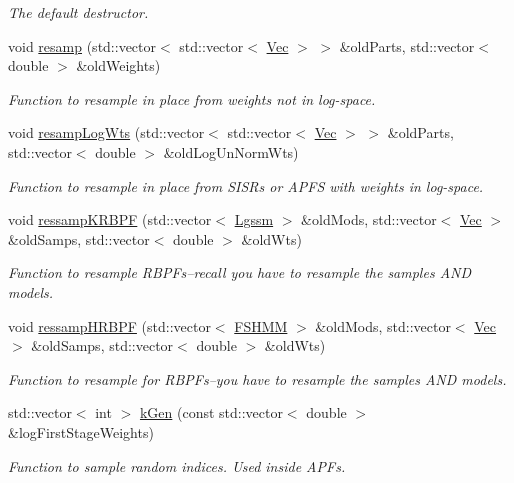 \begin{DoxyCompactItemize}
\begin{DoxyCompactList}\small\item\em The default destructor. \end{DoxyCompactList}\item 
void \hyperlink{classMultinomResamp_a0c24d6d59254855421b8ae13b2ebbcd9}{resamp} (std\+::vector$<$ std\+::vector$<$ \hyperlink{pmfs_8h_a4c7df05c6f5e8a0d15ae14bcdbc07152}{Vec} $>$ $>$ \&old\+Parts, std\+::vector$<$ double $>$ \&old\+Weights)
\begin{DoxyCompactList}\small\item\em Function to resample in place from weights {\itshape not} in log-\/space. \end{DoxyCompactList}\item 
void \hyperlink{classMultinomResamp_a0ea6269180faf0b0613072d9bc8a7b53}{resamp\+Log\+Wts} (std\+::vector$<$ std\+::vector$<$ \hyperlink{pmfs_8h_a4c7df05c6f5e8a0d15ae14bcdbc07152}{Vec} $>$ $>$ \&old\+Parts, std\+::vector$<$ double $>$ \&old\+Log\+Un\+Norm\+Wts)
\begin{DoxyCompactList}\small\item\em Function to resample in place from S\+I\+S\+Rs or A\+P\+FS with weights in log-\/space. \end{DoxyCompactList}\item 
void \hyperlink{classMultinomResamp_ad39c4f5d5460e3e4a2c56370c8dab39f}{ressamp\+K\+R\+B\+PF} (std\+::vector$<$ \hyperlink{classLgssm}{Lgssm} $>$ \&old\+Mods, std\+::vector$<$ \hyperlink{pmfs_8h_a4c7df05c6f5e8a0d15ae14bcdbc07152}{Vec} $>$ \&old\+Samps, std\+::vector$<$ double $>$ \&old\+Wts)
\begin{DoxyCompactList}\small\item\em Function to resample R\+B\+P\+Fs--recall you have to resample the samples A\+ND models. \end{DoxyCompactList}\item 
void \hyperlink{classMultinomResamp_aaddcbec4eb62954d8d7aa96c45ffd7d0}{ressamp\+H\+R\+B\+PF} (std\+::vector$<$ \hyperlink{classFSHMM}{F\+S\+H\+MM} $>$ \&old\+Mods, std\+::vector$<$ \hyperlink{pmfs_8h_a4c7df05c6f5e8a0d15ae14bcdbc07152}{Vec} $>$ \&old\+Samps, std\+::vector$<$ double $>$ \&old\+Wts)
\begin{DoxyCompactList}\small\item\em Function to resample for R\+B\+P\+Fs--you have to resample the samples A\+ND models. \end{DoxyCompactList}\item 
std\+::vector$<$ int $>$ \hyperlink{classMultinomResamp_ad29946389803294445cb27e74d949cd5}{k\+Gen} (const std\+::vector$<$ double $>$ \&log\+First\+Stage\+Weights)
\begin{DoxyCompactList}\small\item\em Function to sample random indices. Used inside A\+P\+Fs. \end{DoxyCompactList}\end{DoxyCompactItemize}


